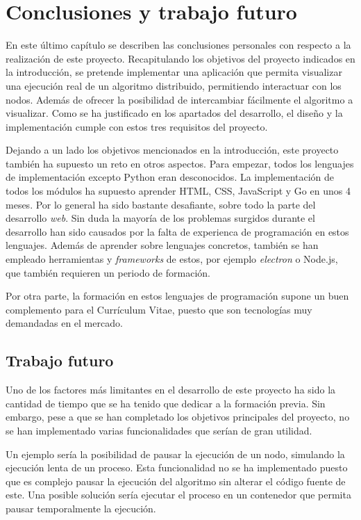 \chapter{Conclusiones y trabajo futuro}

En este último capítulo se describen las conclusiones personales con respecto a la realización de este proyecto. Recapitulando los objetivos del proyecto indicados en la introducción, se pretende implementar una aplicación que permita visualizar una ejecución real de un algoritmo distribuido, permitiendo interactuar con los nodos. Además de ofrecer la posibilidad de intercambiar fácilmente el algoritmo a visualizar. Como se ha justificado en los apartados del desarrollo, el diseño y la implementación cumple con estos tres requisitos del proyecto.

Dejando a un lado los objetivos mencionados en la introducción, este proyecto también ha supuesto un reto en otros aspectos. Para empezar, todos los lenguajes de implementación excepto Python eran desconocidos. La implementación de todos los módulos ha supuesto aprender HTML, CSS, JavaScript y Go en unos 4 meses. Por lo general ha sido bastante desafiante, sobre todo la parte del desarrollo \textit{web}. Sin duda la mayoría de los problemas surgidos durante el desarrollo han sido causados por la falta de experienca de programación en estos lenguajes. Además de aprender sobre lenguajes concretos, también se han empleado herramientas y \textit{frameworks} de estos, por ejemplo \textit{electron}\cite{electron} o Node.js\cite{nodejs}, que también requieren un periodo de formación.

Por otra parte, la formación en estos lenguajes de programación supone un buen complemento para el Currículum Vitae, puesto que son tecnologías muy demandadas en el mercado. 

\section{Trabajo futuro}

Uno de los factores más limitantes en el desarrollo de este proyecto ha sido la cantidad de tiempo que se ha tenido que dedicar a la formación previa. Sin embargo, pese a que se han completado los objetivos principales del proyecto, no se han implementado varias funcionalidades que serían de gran utilidad.

Un ejemplo sería la posibilidad de pausar la ejecución de un nodo, simulando la ejecución lenta de un proceso. Esta funcionalidad no se ha implementado puesto que es complejo pausar la ejecución del algoritmo sin alterar el código fuente de este. Una posible solución sería ejecutar el proceso en un contenedor que permita pausar temporalmente la ejecución.

